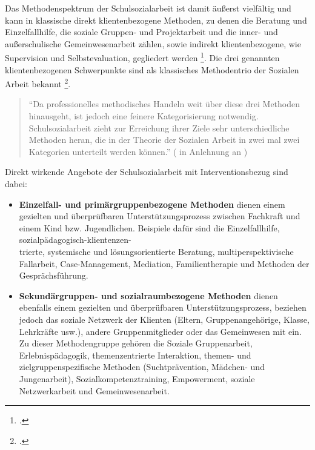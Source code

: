 \noindent
Das Methodenspektrum der Schulsozialarbeit ist damit äußerst vielfältig und kann in klassische direkt klientenbezogene Methoden, zu denen die Beratung und Einzelfallhilfe, die soziale Gruppen- und Projektarbeit und die inner- und außerschulische Gemeinwesenarbeit zählen, sowie indirekt klientenbezogene, wie Supervision und Selbstevaluation, gegliedert werden \footcites[vgl.][22]{Kilb2009}[vgl.][64]{Speck2007}. Die drei genannten klientenbezogenen Schwerpunkte sind als klassisches Methodentrio der Sozialen Arbeit bekannt \footcite[vgl.][95]{Stuewe2015}. 

\begin{quotation}
\noindent
"`Da professionelles methodisches Handeln weit über diese drei Methoden hinausgeht, ist jedoch eine feinere Kategorisierung notwendig. Schulsozialarbeit zieht zur Erreichung ihrer Ziele sehr unterschiedliche Methoden heran, die in der Theorie der Sozialen Arbeit in zwei mal zwei Kategorien unterteilt werden können."' (\cite[vgl.][95]{Stuewe2015} in Anlehnung an \cite[64f]{Speck2007})
\end{quotation}

\noindent
Direkt wirkende Angebote der Schulsozialarbeit mit Interventionsbezug sind dabei:
\begin{itemize}
	\item \textbf{Einzelfall- und primärgruppenbezogene Methoden} dienen einem gezielten und überprüfbaren Unterstützungsprozess zwischen Fachkraft und einem Kind bzw. Jugendlichen. Beispiele dafür sind die Einzelfallhilfe, sozialpädagogisch-klientenzen-\\
	trierte, systemische und lösungsorientierte Beratung, multiperspektivische Fallarbeit, Case-Management, Mediation, Familientherapie und Methoden der Gesprächsführung. 
	\item \textbf{Sekundärgruppen- und sozialraumbezogene Methoden} dienen ebenfalls einem gezielten und überprüfbaren Unterstützungsprozess, beziehen jedoch das soziale Netzwerk der Klienten (Eltern, Gruppenangehörige, Klasse, Lehrkräfte usw.), andere Gruppenmitglieder oder das Gemeinwesen mit ein. Zu dieser Methodengruppe gehören die Soziale Gruppenarbeit, Erlebnispädagogik, themenzentrierte Interaktion, themen- und zielgruppenspezifische Methoden (Suchtprävention, Mädchen- und Jungenarbeit), Sozialkompetenztraining, Empowerment, soziale Netzwerkarbeit und Gemeinwesenarbeit. 
\end{itemize}

